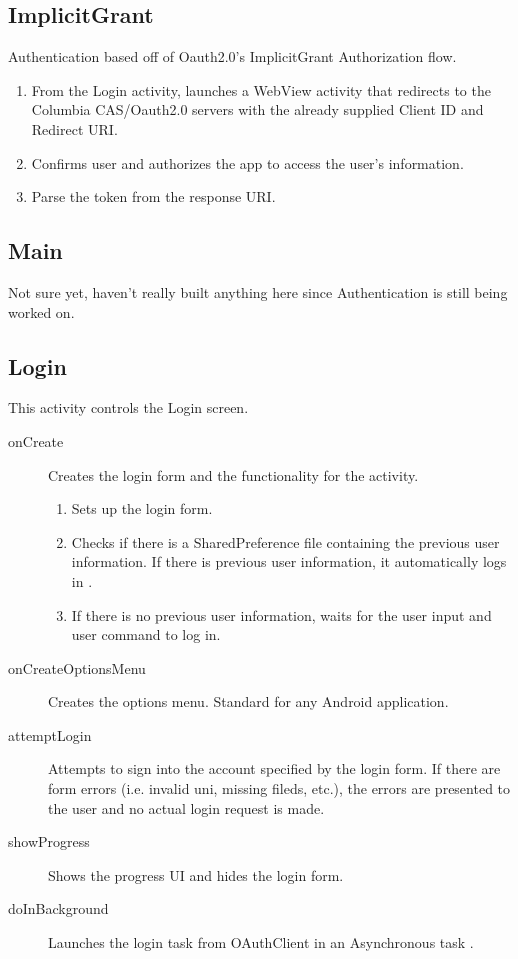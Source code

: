 \documentclass{article}
\begin{document}
\subsection{ImplicitGrant}
Authentication based off of Oauth2.0's ImplicitGrant Authorization flow. 
\begin{enumerate}
    \item From the Login activity, launches a WebView activity that redirects to the 
          Columbia CAS/Oauth2.0 servers with the already supplied Client ID and Redirect 
          URI.
    \item Confirms user and authorizes the app to access the user's information.
    \item Parse the token from the response URI.
\end{enumerate}

\subsection{Main}
Not sure yet, haven't really built anything here since Authentication is still being worked on.

\subsection{Login}
This activity controls the Login screen.
\begin{description}
    \item[onCreate] Creates the login form and the functionality for the activity. 
    \begin{enumerate}
        \item Sets up the login form.
        \item Checks if there is a SharedPreference file containing the previous user 
              information. If there is previous user information, it automatically logs in
              .
        \item If there is no previous user information, waits for the user input and user 
              command to log in.
    \end{enumerate}
    \item[onCreateOptionsMenu] Creates the options menu. Standard for any Android 
                               application.
    \item[attemptLogin] Attempts to sign into the account specified by the login form. If 
                        there are form errors (i.e. invalid uni, missing fileds, etc.), 
                        the errors are presented to the user and no actual login request 
                        is made.
    \item[showProgress] Shows the progress UI and hides the login form.
    \item[doInBackground] Launches the login task from OAuthClient in an Asynchronous task
                          .
\end{description}
\end{document}
